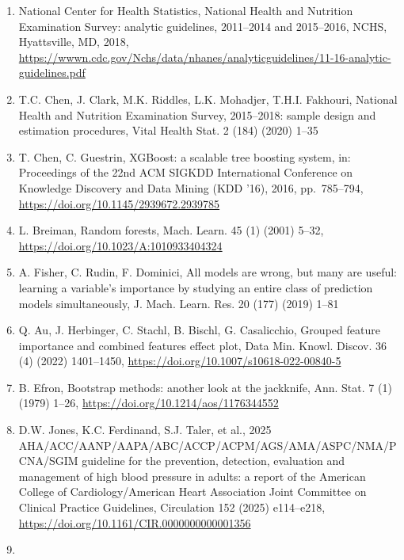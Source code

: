 \documentclass[
  11pt,
]{article}
\begin{document}
\begin{enumerate}
  of the 2020 AAAI/\allowbreak{}ACM Conference on AI, Ethics, and
  Society (AIES '20), 2020, pp.~344--350,
  \url{https://doi.org/10.1145/3375627.3375850}
\item
  National Center for Health Statistics, National Health and Nutrition
  Examination Survey: analytic guidelines, 2011--2014 and 2015--2016,
  NCHS, Hyattsville, MD, 2018,
  \url{https://wwwn.cdc.gov/Nchs/data/nhanes/analyticguidelines/11-16-analytic-guidelines.pdf}
\item
  T.C. Chen, J. Clark, M.K. Riddles, L.K. Mohadjer, T.H.I. Fakhouri,
  National Health and Nutrition Examination Survey, 2015--2018: sample
  design and estimation procedures, Vital Health Stat. 2 (184) (2020)
  1--35
\item
  T. Chen, C. Guestrin, XGBoost: a scalable tree boosting system, in:
  Proceedings of the 22nd ACM SIGKDD International Conference on
  Knowledge Discovery and Data Mining (KDD '16), 2016, pp.~785--794,
  \url{https://doi.org/10.1145/2939672.2939785}
\item
  L. Breiman, Random forests, Mach. Learn. 45 (1) (2001) 5--32,
  \url{https://doi.org/10.1023/A:1010933404324}
\item
  A. Fisher, C. Rudin, F. Dominici, All models are wrong, but many are
  useful: learning a variable's importance by studying an entire class
  of prediction models simultaneously, J. Mach. Learn. Res. 20 (177)
  (2019) 1--81
\item
  Q. Au, J. Herbinger, C. Stachl, B. Bischl, G. Casalicchio, Grouped
  feature importance and combined features effect plot, Data Min. Knowl.
  Discov. 36 (4) (2022) 1401--1450,
  \url{https://doi.org/10.1007/s10618-022-00840-5}
\item
  B. Efron, Bootstrap methods: another look at the jackknife, Ann. Stat.
  7 (1) (1979) 1--26, \url{https://doi.org/10.1214/aos/1176344552}
\item
  D.W. Jones, K.C. Ferdinand, S.J. Taler, et al., 2025
  AHA/\allowbreak{}ACC/\allowbreak{}AANP/\allowbreak{}AAPA/\allowbreak{}ABC/\allowbreak{}ACCP/\allowbreak{}ACPM/\allowbreak{}AGS/\allowbreak{}AMA/\allowbreak{}ASPC/\allowbreak{}NMA/\allowbreak{}PCNA/\allowbreak{}SGIM
  guideline for the prevention, detection, evaluation and management of
  high blood pressure in adults: a report of the American College of
  Cardiology/\allowbreak{}American Heart Association Joint Committee on
  Clinical Practice Guidelines, Circulation 152 (2025) e114--e218,
  \url{https://doi.org/10.1161/CIR.0000000000001356}
\item

\end{enumerate}
\end{document}
